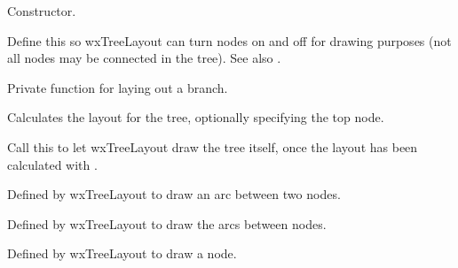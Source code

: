 




Constructor.

\label{wxtreelayoutactivatenode}


Define this so wxTreeLayout can turn nodes on and off for drawing purposes
(not all nodes may be connected in the tree). See also .



Private function for laying out a branch.

\label{wxtreelayoutdolayout}


Calculates the layout for the tree, optionally specifying the top node.

\label{wxtreelayoutdraw}


Call this to let wxTreeLayout draw the tree itself, once the layout has been
calculated with .



Defined by wxTreeLayout to draw an arc between two nodes.



Defined by wxTreeLayout to draw the arcs between nodes.



Defined by wxTreeLayout to draw a node.

